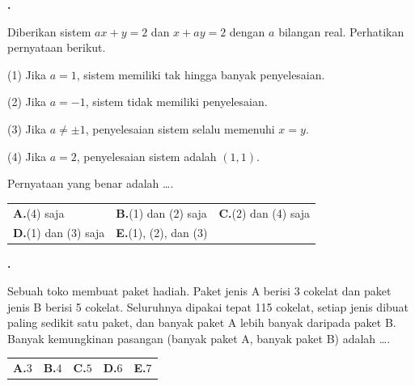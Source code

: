 \documentclass[a4paper,11pt]{article}
\newcounter{no}
\newcommand{\soal}[2]{\par\vspace{0.75em}\stepcounter{no}\noindent
  \begin{minipage}[t]{1.8em}\textbf{\theno.}\end{minipage}%
  \begin{minipage}[t]{\dimexpr\linewidth-1.8em\relax}#1\par\vspace{0.35em}#2\end{minipage}\par}
\begin{document}
\soal{Diberikan sistem $ax+y=2$ dan $x+ay=2$ dengan $a$ bilangan real. Perhatikan pernyataan berikut.\par\smallskip\hspace*{0.3em}(1) Jika $a=1$, sistem memiliki tak hingga banyak penyelesaian.\par\hspace*{0.3em}(2) Jika $a=-1$, sistem tidak memiliki penyelesaian.\par\hspace*{0.3em}(3) Jika $a\neq\pm1$, penyelesaian sistem selalu memenuhi $x=y$.\par\hspace*{0.3em}(4) Jika $a=2$, penyelesaian sistem adalah $(1,1)$.\par\smallskip Pernyataan yang benar adalah \dots.}{\begin{tabularx}{\linewidth}{@{}*{3}{X}@{}}\textbf{A.}\;(4) saja & \textbf{B.}\;(1) dan (2) saja & \textbf{C.}\;(2) dan (4) saja\\[3pt] \textbf{D.}\;(1) dan (3) saja & \textbf{E.}\;(1), (2), dan (3) & \end{tabularx}}
\soal{Sebuah toko membuat paket hadiah. Paket jenis A berisi 3 cokelat dan paket jenis B berisi 5 cokelat. Seluruhnya dipakai tepat 115 cokelat, setiap jenis dibuat paling sedikit satu paket, dan banyak paket A lebih banyak daripada paket B. Banyak kemungkinan pasangan (banyak paket A, banyak paket B) adalah \dots.}{\begin{tabularx}{\linewidth}{@{}*{5}{X}@{}}\textbf{A.}\;$3$ & \textbf{B.}\;$4$ & \textbf{C.}\;$5$ & \textbf{D.}\;$6$ & \textbf{E.}\;$7$\end{tabularx}}
\end{document}
